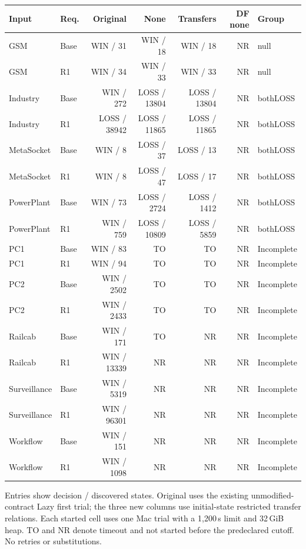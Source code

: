 
\begin{tabular}{llrrrrl}
\toprule
Input & Req. & Original & None & Transfers & DF none & Group \\
\midrule
GSM & Base & WIN / 31 & WIN / 18 & WIN / 18 & NR & null \\
GSM & R1 & WIN / 34 & WIN / 33 & WIN / 33 & NR & null \\
Industry & Base & WIN / 272 & LOSS / 13804 & LOSS / 13804 & NR & bothLOSS \\
Industry & R1 & LOSS / 38942 & LOSS / 11865 & LOSS / 11865 & NR & bothLOSS \\
MetaSocket & Base & WIN / 8 & LOSS / 37 & LOSS / 13 & NR & bothLOSS \\
MetaSocket & R1 & WIN / 8 & LOSS / 47 & LOSS / 17 & NR & bothLOSS \\
PowerPlant & Base & WIN / 73 & LOSS / 2724 & LOSS / 1412 & NR & bothLOSS \\
PowerPlant & R1 & WIN / 759 & LOSS / 10809 & LOSS / 5859 & NR & bothLOSS \\
PC1 & Base & WIN / 83 & TO & TO & NR & Incomplete \\
PC1 & R1 & WIN / 94 & TO & TO & NR & Incomplete \\
PC2 & Base & WIN / 2502 & TO & TO & NR & Incomplete \\
PC2 & R1 & WIN / 2433 & TO & TO & NR & Incomplete \\
Railcab & Base & WIN / 171 & TO & NR & NR & Incomplete \\
Railcab & R1 & WIN / 13339 & NR & NR & NR & Incomplete \\
Surveillance & Base & WIN / 5319 & NR & NR & NR & Incomplete \\
Surveillance & R1 & WIN / 96301 & NR & NR & NR & Incomplete \\
Workflow & Base & WIN / 151 & NR & NR & NR & Incomplete \\
Workflow & R1 & WIN / 1098 & NR & NR & NR & Incomplete \\
\bottomrule
\end{tabular}
{\par\smallskip\footnotesize Entries show decision / discovered states. Original uses the existing unmodified-contract Lazy first trial; the three new columns use initial-state restricted transfer relations. Each started cell uses one Mac trial with a 1,200\,s limit and 32\,GiB heap. TO and NR denote timeout and not started before the predeclared cutoff. No retries or substitutions.}
